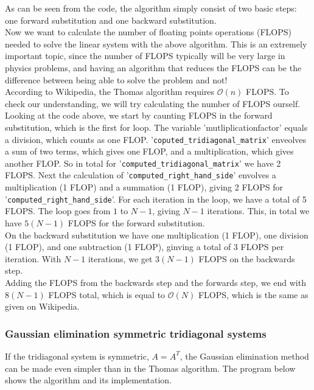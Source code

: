 \documentclass{article}
\begin{document}
As can be seen from the code, the algorithm simply consist of two basic steps: one forward substitution and one backward substitution.\\

Now we want to calculate the number of floating points operations (FLOPS) needed to solve the linear system with the above algorithm. This is an extremely important topic, since the number of FLOPS typically will be very large in physics problems, and having an algorithm that reduces the FLOPS can be the difference between being able to solve the problem and not!\\

According to Wikipedia, the Thomas algorithm requires $\mathcal{O}(n)$ FLOPS. To check our understanding, we will try calculating the number of FLOPS ourself.\\
 
Looking at the code above, we start by caunting FLOPS in the forward substitution, which is the first for loop. The variable 'mutliplicationfactor' equals a division, which counts as one FLOP. '\texttt{coputed\_tridiagonal\_matrix}' enveolves a sum of two terms, which gives one FLOP, and a multiplication, which gives another FLOP. So in total for '\texttt{computed\_tridiagonal\_matrix}' we have 2 FLOPS. Next the calculation of '\texttt{computed\_right\_hand\_side}' envolves a multiplication (1 FLOP) and a summation (1 FLOP), giving 2 FLOPS for '\texttt{computed\_right\_hand\_side}'. For each iteration in the loop, we have a total of 5 FLOPS. The loop goes from $1$ to $N-1$, giving $N-1$ iterations. This, in total we have $5(N-1)$ FLOPS for the forward substitution.\\

On the backward substitution we have one multiplication (1 FLOP), one division (1 FLOP), and one subtraction (1 FLOP), ginving a total of 3 FLOPS per iteration. With $N-1$ iterations, we get $3(N-1)$ FLOPS on the backwards step.\\

Adding the FLOPS from the backwards step and the forwards step, we end with $8(N-1)$ FLOPS total, which is equal to $\mathcal{O}(N)$ FLOPS, which is the same as given on Wikipedia.

\subsubsection{Gaussian elimination symmetric tridiagonal systems}
If the tridiagonal system is symmetric, $A = A^T$, the Gaussian elimination method can be made even simpler than in the Thomas algorithm. The program below shows the algorithm and its implementation.
\end{document}
